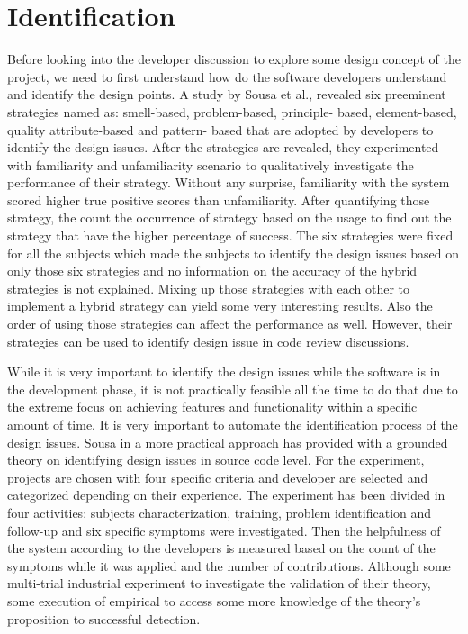 \section{Identification}
\label{sect:identification}

Before looking into the developer discussion to explore some design concept of the project, we need to first understand how do the software developers understand and identify the design points. A study by Sousa et al.,\cite{Sousa2017} revealed six preeminent strategies named as: smell-based, problem-based, principle- based, element-based, quality attribute-based and pattern- based that are adopted by developers to identify the design issues. After the strategies are revealed, they experimented with familiarity and unfamiliarity scenario to qualitatively investigate the performance of their strategy. Without any surprise, familiarity with the system scored higher true positive scores than unfamiliarity. After quantifying those strategy, the count the occurrence of strategy based on the usage to find out the strategy that have the higher percentage of success. The six strategies were fixed for all the subjects which made the subjects to identify the design issues based on only those six strategies and no information on the accuracy of the hybrid strategies is not explained. Mixing up those strategies with each other to implement a hybrid strategy can yield some very interesting results. Also the order of using those strategies can affect the performance as well. However, their strategies can be used to identify design issue in code review discussions.
     
While it is very important to identify the design issues while the software is in the development phase, it is not practically feasible all the time to do that due to the extreme focus on achieving features and functionality within a specific amount of time. It is very important to automate the identification process of the design issues. Sousa in a more practical approach \cite{Sousa2018} has provided with a grounded theory on identifying design issues in source code level. For the experiment, projects are chosen with four specific criteria and developer are selected and categorized depending on their experience. The experiment has been divided in four activities: subjects characterization, training, problem identification and follow-up and six specific symptoms were investigated. Then the helpfulness of the system according to the developers is measured based on the count of the symptoms while it was applied and the number of contributions. Although some multi-trial industrial experiment to investigate the validation of their theory, some execution of empirical to access some more knowledge of the theory's proposition to successful detection.

